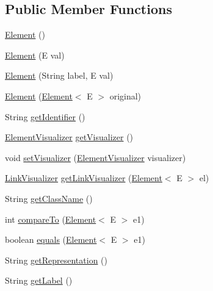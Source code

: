 \subsection*{Public Member Functions}
\begin{DoxyCompactItemize}
\item 
\hyperlink{classbridges_1_1base_1_1_element_aa5fc5728f2ed4b041118a77409442390}{Element} ()
\item 
\hyperlink{classbridges_1_1base_1_1_element_a6cb9b3b85b923602aad5c1be6696d825}{Element} (E val)
\item 
\hyperlink{classbridges_1_1base_1_1_element_a14e857e8050eac518900a458f0364d8e}{Element} (String label, E val)
\item 
\hyperlink{classbridges_1_1base_1_1_element_a91db9de70b65a1d7b5f27c1c0b909832}{Element} (\hyperlink{classbridges_1_1base_1_1_element}{Element}$<$ E $>$ original)
\item 
String \hyperlink{classbridges_1_1base_1_1_element_ad5496f568b4cca3909800eceea5fb47d}{get\+Identifier} ()
\item 
\hyperlink{classbridges_1_1base_1_1_element_visualizer}{Element\+Visualizer} \hyperlink{classbridges_1_1base_1_1_element_a42c84d41dfb7bd05a586e303cb33de72}{get\+Visualizer} ()
\item 
void \hyperlink{classbridges_1_1base_1_1_element_a5befa95788099f1bc72cdf5361c55bed}{set\+Visualizer} (\hyperlink{classbridges_1_1base_1_1_element_visualizer}{Element\+Visualizer} visualizer)
\item 
\hyperlink{classbridges_1_1base_1_1_link_visualizer}{Link\+Visualizer} \hyperlink{classbridges_1_1base_1_1_element_a7978552c7b36e28c302f611fc1958e7f}{get\+Link\+Visualizer} (\hyperlink{classbridges_1_1base_1_1_element}{Element}$<$ E $>$ el)
\item 
String \hyperlink{classbridges_1_1base_1_1_element_aa235244426486921bef319a28616bf8b}{get\+Class\+Name} ()
\item 
int \hyperlink{classbridges_1_1base_1_1_element_a6cd4c4f15c6a4f87f59e443cffe87a20}{compare\+To} (\hyperlink{classbridges_1_1base_1_1_element}{Element}$<$ E $>$ e1)
\item 
boolean \hyperlink{classbridges_1_1base_1_1_element_aff10d60700eb1aceca5c0b519bdccccb}{equals} (\hyperlink{classbridges_1_1base_1_1_element}{Element}$<$ E $>$ e1)
\item 
String \hyperlink{classbridges_1_1base_1_1_element_a16c4c7e0d511fbf0e205d5606b9d690e}{get\+Representation} ()
\item 
String \hyperlink{classbridges_1_1base_1_1_element_a5c831a0238de487765f6021a887f1542}{get\+Label} ()

\end{DoxyCompactItemize}
